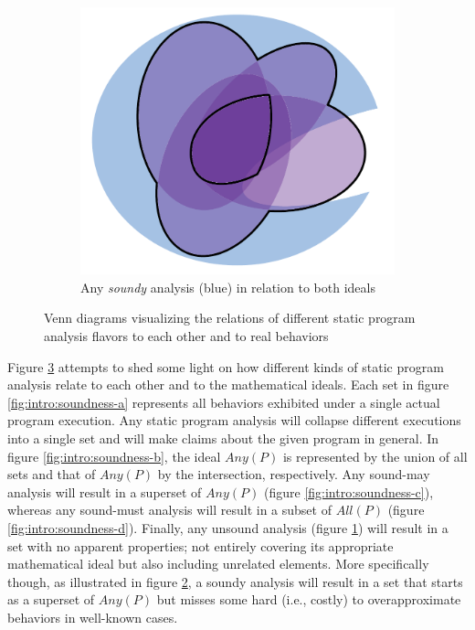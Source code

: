 \begin{figure}[htb!]
\begin{subfigure}{.47\textwidth}
    \label{fig:intro:soundness-e}
\end{subfigure}
\hfill
\begin{subfigure}{.47\textwidth}
    \includegraphics[scale=.45]{assets/intro/venn-soundness-f.pdf}
    \caption{Any \emph{soundy} analysis (blue) in relation to both ideals}
    \label{fig:intro:soundness-f}
\end{subfigure}
\caption{Venn diagrams visualizing the relations of different static program analysis flavors to each other and to real behaviors}
\label{fig:intro:soundness}
\end{figure}

Figure \ref{fig:intro:soundness} attempts to shed some light on how different kinds
of static program analysis relate to each other and to the mathematical ideals.
Each set in figure \ref{fig:intro:soundness-a} represents all behaviors exhibited
under a single actual program execution. Any static program analysis will
collapse different executions into a single set and will make claims about the
given program in general. In figure \ref{fig:intro:soundness-b}, the ideal $Any(P)$
is represented by the union of all sets and that of $Any(P)$ by the
intersection, respectively. Any sound-may analysis will result in a superset of
$Any(P)$ (figure \ref{fig:intro:soundness-c}), whereas any sound-must analysis will
result in a subset of $All(P)$ (figure \ref{fig:intro:soundness-d}). Finally, any
unsound analysis (figure \ref{fig:intro:soundness-e}) will result in a set with no
apparent properties; not entirely covering its appropriate mathematical ideal
but also including unrelated elements. More specifically though, as illustrated
in figure \ref{fig:intro:soundness-f}, a soundy analysis will result in a set that
starts as a superset of $Any(P)$ but misses some hard (i.e., costly) to
overapproximate behaviors in well-known cases.


